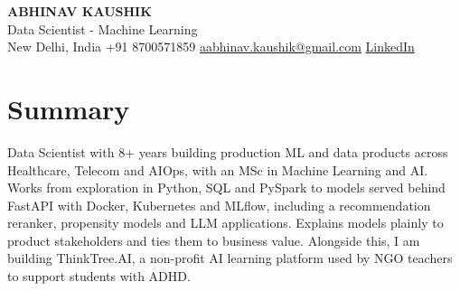 \documentclass[10pt,a4paper]{article}
\begin{document}
\begin{center}
  {\LARGE\bfseries ABHINAV KAUSHIK}\\[2pt]
  {\large Data Scientist - Machine Learning}\\[2pt]
  New Delhi, India \textbar{} +91 8700571859 \textbar{} \href{mailto:aabhinav.kaushik@gmail.com}{aabhinav.kaushik@gmail.com} \textbar{} \href{https://www.linkedin.com/in/abhinav-kaushik10/}{LinkedIn}  
\end{center}

\section{Summary}
Data Scientist with 8+ years building production ML and data products across Healthcare, Telecom and AIOps, with an MSc in Machine Learning and AI. Works from exploration in Python, SQL and PySpark to models served behind FastAPI with Docker, Kubernetes and MLflow, including a recommendation reranker, propensity models and LLM applications. Explains models plainly to product stakeholders and ties them to business value. Alongside this, I am building ThinkTree.AI, a non-profit AI learning platform used by NGO teachers to support students with ADHD.
\end{document}
